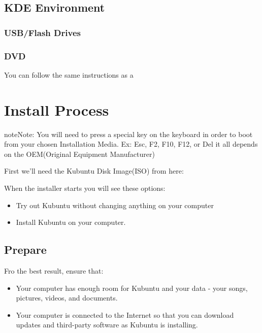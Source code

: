 \documentclass[letterpaper,10pt,english]{sphinxmanual}
\begin{document}
\subsection{KDE Environment}
\label{\detokenize{docs/installation:kde-environment}}

\subsubsection{USB/Flash Drives}
\label{\detokenize{docs/installation:id5}}

\subsubsection{DVD}
\label{\detokenize{docs/installation:id6}}
You can follow the same instructions as a {\hyperref[\detokenize{docs/installation:kubuntu-install-link}]{}}


\section{Install Process}
\label{\detokenize{docs/installation:install-process}}
\begin{sphinxadmonition}{note}{Note:}
You will need to press a special key on the keyboard in order to boot from your chosen Installation Media. Ex: Esc, F2, F10, F12, or Del it all depends on the OEM(Original Equipment Manufacturer)
\end{sphinxadmonition}

First we'll need the Kubuntu Disk Image(ISO) from here: {\hyperref[\detokenize{docs/installation:get-kubuntu-link}]{}}


When the installer starts you will see these options:
\begin{itemize}
\item {} 
Try out Kubuntu without changing anything on your computer

\item {} 
Install Kubuntu on your computer.

\end{itemize}


\subsection{Prepare}
\label{\detokenize{docs/installation:prepare}}
Fro the best result, ensure that:
\begin{itemize}
\item {} 
Your computer has enough room for Kubuntu and your data - your songs, pictures, videos, and documents.

\item {} 
Your computer is connected to the Internet so that you can download updates and third-party software as Kubuntu is installing.

\end{itemize}
\end{document}
